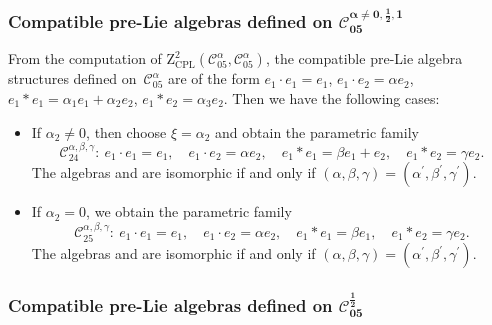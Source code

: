 \documentclass[10pt,a4paper]{amsart}
\numberwithin{equation}{section}
\begin{document}
\subsubsection[Compatible pre-Lie algebras defined on C\_\{05\}\^{}\{alpha not = 0,1/2,1\}]{Compatible pre-Lie algebras defined on $\boldsymbol{\mathcal{C}_{05}^{\alpha \not= 0,\frac{1}{2},1}}$}

From the computation of $\mathrm{Z}_{\mathrm{CPL}}^{2}(\mathcal{C}%
_{05}^{\alpha },\mathcal{C}_{05}^{\alpha })$, the compatible pre-Lie algebra
structures defined on~$\mathcal{C}_{05}^{\alpha }$ are of the form
$e_{1}\cdot e_{1}=e_{1}$, $e_{1}\cdot e_{2}=\alpha e_{2}$, $e_{1}\ast e_{1}=\alpha _{1}e_{1}+\alpha _{2}e_{2}$, $e_{1}\ast
e_{2}=\alpha _{3}e_{2}$.
Then we have the following cases:
\begin{itemize}\itemsep=0pt
\item If $\alpha _{2}\neq 0$, then choose $\xi =\alpha _{2}$ and
obtain the parametric family
\[
\mathcal{C}_{24}^{\alpha ,\beta ,\gamma }\colon \
e_{1}\cdot e_{1}=e_{1}, \quad e_{1}\cdot e_{2}=\alpha e_{2}, \quad
e_{1}\ast e_{1}=\beta e_{1}+e_{2}, \quad e_{1}\ast e_{2}=\gamma e_{2}.
\]
The algebras  and \smash{$\mathcal{C}%
_{24}^{\alpha ^{\prime }\beta ^{\prime },\gamma ^{\prime }}$} are isomorphic
if and only if $(\alpha, \beta, \gamma)=(\alpha ^{\prime },\beta ^{\prime },
\gamma ^{\prime })$.

\item If $\alpha _{2}=0$, we obtain the parametric family
\[
\mathcal{C}_{25}^{\alpha ,\beta ,\gamma } \colon \
e_{1}\cdot e_{1}=e_{1}, \quad e_{1}\cdot e_{2}=\alpha e_{2}, \quad
e_{1}\ast e_{1}=\beta e_{1}, \quad e_{1}\ast e_{2}=\gamma e_{2}.
\]
The algebras \smash{$\mathcal{C}_{25}^{\alpha ,\beta ,\gamma }$} and  are isomorphic
if and only if $(\alpha, \beta, \gamma)=(\alpha ^{\prime },\beta ^{\prime },
\gamma ^{\prime })$.
\end{itemize}

\subsubsection[Compatible pre-Lie algebras defined on C\_\{05\}\^{}\{1/2\}]{Compatible pre-Lie algebras defined on $\boldsymbol{\mathcal{C}_{05}^{\frac{1}{2}}}$}
\end{document}

